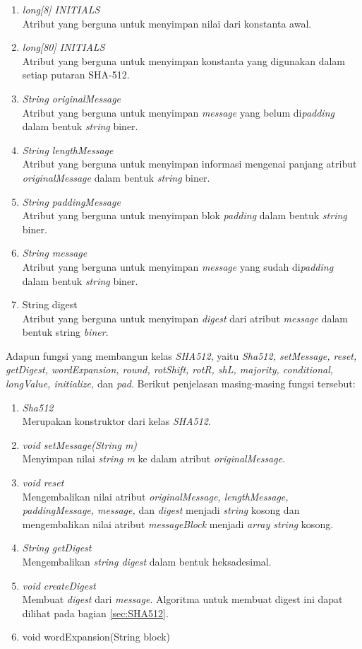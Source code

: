 \begin{enumerate}
	\item \textit{long[8] INITIALS} \\
	Atribut yang berguna untuk menyimpan nilai dari konstanta awal.
	\item \textit{long[80] INITIALS} \\
	Atribut yang berguna untuk menyimpan konstanta yang digunakan dalam setiap putaran SHA-512.
	\item \textit{String originalMessage} \\
	Atribut yang berguna untuk menyimpan \textit{message} yang belum di\textit{padding} dalam bentuk \textit{string} biner.
	\item \textit{String lengthMessage} \\
	Atribut yang berguna untuk menyimpan informasi mengenai panjang atribut \textit{originalMessage} dalam bentuk \textit{string} biner.
	\item \textit{String paddingMessage} \\
	Atribut yang berguna untuk menyimpan blok \textit{padding} dalam bentuk \textit{string} biner.
	\item \textit{String message} \\
	Atribut yang berguna untuk menyimpan \textit{message} yang sudah di\textit{padding} dalam bentuk \textit{string} biner.
	\item String digest \\
	Atribut yang berguna untuk menyimpan \textit{digest} dari atribut \textit{message} dalam bentuk string \textit{biner}.
\end{enumerate}

Adapun fungsi yang membangun kelas \textit{SHA512}, yaitu \textit{Sha512, setMessage, reset, getDigest, wordExpansion, round, rotShift, rotR, shL, majority, conditional, longValue, initialize,} dan \textit{pad}. Berikut penjelasan masing-masing fungsi tersebut:

\begin{enumerate}
	\item \textit{Sha512} \\
	Merupakan konstruktor dari kelas \textit{SHA512}.
	\item \textit{void setMessage(String m)} \\
	Menyimpan nilai \textit{string m} ke dalam atribut \textit{originalMessage}.
	\item \textit{void reset} \\
	Mengembalikan nilai atribut \textit{originalMessage, lengthMessage, paddingMessage, message,} dan \textit{digest} menjadi \textit{string} kosong dan mengembalikan nilai atribut \textit{messageBlock} menjadi \textit{array string} kosong.
	\item \textit{String getDigest} \\
	Mengembalikan \textit{string digest} dalam bentuk heksadesimal.
	\item \textit{void createDigest} \\
	Membuat \textit{digest} dari \textit{message}. Algoritma untuk membuat digest ini dapat dilihat pada bagian \ref{sec:SHA512}.
	\item void wordExpansion(String block)
\end{enumerate}

